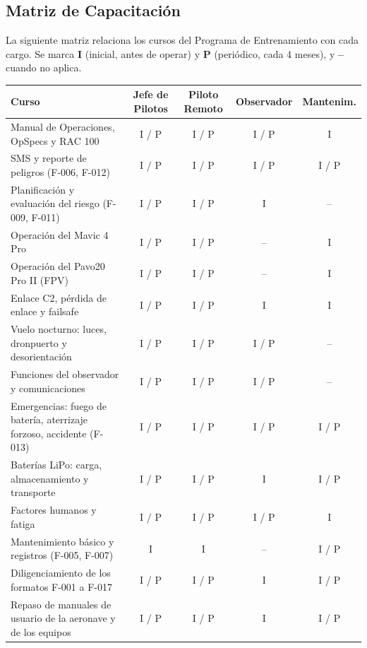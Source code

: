 \subsection{Matriz de Capacitación}

La siguiente matriz relaciona los cursos del Programa de Entrenamiento con cada cargo. Se marca \textbf{I} (inicial, antes de operar) y \textbf{P} (periódico, cada 4 meses), y \textbf{--} cuando no aplica.

\begin{table}[H]
    \centering
    \renewcommand{\arraystretch}{1.2}
    \begin{tabular}{|p{5.2cm}|c|c|c|c|}
        \hline
        \rowcolor[gray]{0.9} \textbf{Curso} & \textbf{Jefe de Pilotos} & \textbf{Piloto Remoto} & \textbf{Observador} & \textbf{Mantenim.} \\ \hline
        Manual de Operaciones, OpSpecs y RAC 100 & I / P & I / P & I / P & I \\ \hline
        SMS y reporte de peligros (F-006, F-012) & I / P & I / P & I / P & I / P \\ \hline
        Planificación y evaluación del riesgo (F-009, F-011) & I / P & I / P & I & -- \\ \hline
        Operación del Mavic 4 Pro & I / P & I / P & -- & I \\ \hline
        Operación del Pavo20 Pro II (FPV) & I / P & I / P & -- & I \\ \hline
        Enlace C2, pérdida de enlace y failsafe & I / P & I / P & I & I \\ \hline
        Vuelo nocturno: luces, dronpuerto y desorientación & I / P & I / P & I / P & -- \\ \hline
        Funciones del observador y comunicaciones & I / P & I / P & I / P & -- \\ \hline
        Emergencias: fuego de batería, aterrizaje forzoso, accidente (F-013) & I / P & I / P & I / P & I / P \\ \hline
        Baterías LiPo: carga, almacenamiento y transporte & I / P & I / P & I & I / P \\ \hline
        Factores humanos y fatiga & I / P & I / P & I / P & I \\ \hline
        Mantenimiento básico y registros (F-005, F-007) & I & I & -- & I / P \\ \hline
        Diligenciamiento de los formatos F-001 a F-017 & I / P & I / P & I & I / P \\ \hline
        Repaso de manuales de usuario de la aeronave y de los equipos & I / P & I / P & I & I / P \\ \hline
    \end{tabular}
\end{table}

